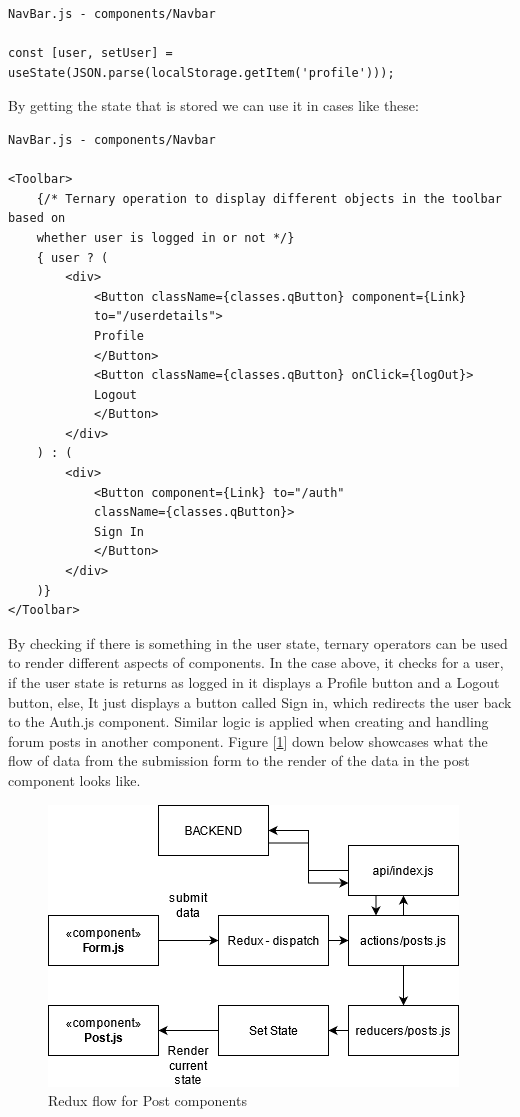 \begin{verbatim}
NavBar.js - components/Navbar

const [user, setUser] = useState(JSON.parse(localStorage.getItem('profile')));
\end{verbatim}

By getting the state that is stored we can use it in cases like these:

\begin{verbatim}
NavBar.js - components/Navbar

<Toolbar>
    {/* Ternary operation to display different objects in the toolbar based on 
    whether user is logged in or not */}
    { user ? (
        <div>
            <Button className={classes.qButton} component={Link} 
            to="/userdetails">
            Profile
            </Button>
            <Button className={classes.qButton} onClick={logOut}>
            Logout
            </Button>
        </div>
    ) : (
        <div>
            <Button component={Link} to="/auth" 
            className={classes.qButton}>
            Sign In
            </Button>
        </div>
    )}
</Toolbar>
\end{verbatim}

By checking if there is something in the user state, ternary operators can be used to render different aspects of components. In the case above, it checks for a user, if the user state is returns as logged in it displays a Profile button and a Logout button, else, It just displays a button called Sign in, which redirects the user back to the Auth.js component. Similar logic is applied when creating and handling forum posts in another component.  Figure [\ref{fig6:redux-flow}] down below showcases what the flow of data from the submission form to the render of the data in the post component looks like.

\begin{figure}
    \centering
    \includegraphics[scale=0.7]{img/redux-flow.png}
    \caption{Redux flow for Post components}
    \label{fig6:redux-flow}
\end{figure}

